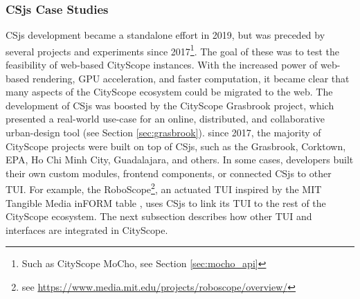 {{      \subsubsection{CSjs Case Studies}
      {
          CSjs development became a standalone effort in 2019, but was preceded by several projects and experiments since 2017\footnote{Such as CityScope MoCho, see Section \eqref{sec:mocho_api}}. The goal of these was to test the feasibility of web-based CityScope instances. With the increased power of web-based rendering, GPU acceleration, and faster computation, it became clear that many aspects of the CityScope ecosystem could be migrated to the web.
          \newline
          The development of CSjs was boosted by the CityScope Grasbrook project, which presented a real-world use-case for an online, distributed, and collaborative urban-design tool (see Section \eqref{sec:grasbrook}). since 2017, the majority of CityScope projects were built on top of CSjs, such as the Grasbrook, Corktown, EPA, Ho Chi Minh City, Guadalajara, and others. In some cases, developers built their own custom modules, frontend components, or connected CSjs to other TUI. For example, the RoboScope\footnote{see \url{https://www.media.mit.edu/projects/roboscope/overview/}}, an actuated TUI inspired by the MIT Tangible Media inFORM table \cite{follmer2013inform}, uses CSjs to link its TUI to the rest of the CityScope ecosystem. The next subsection describes how other TUI and interfaces are integrated in CityScope.
      }
  }

}
